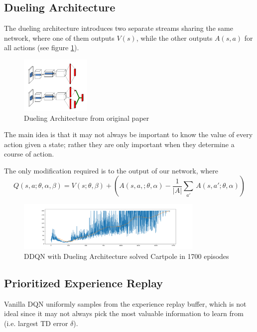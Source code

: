 \documentclass[11pt]{article} %
\begin{document}
\subsection{Dueling Architecture}
The dueling architecture introduces two separate streams sharing the same network, where one of them outputs $V(s)$, while the other outputs $A(s,a)$ for all actions (see figure \ref{fig:duelingarch}).

\begin{figure}
  \begin{center}
    \includegraphics[width=0.3\textwidth]{images/duelingarch.png}
  \end{center}
  \caption{Dueling Architecture from original paper}
  \label{fig:duelingarch}
\end{figure}

The main idea is that it may not always be important to know the value of every action given a state; rather they are only important when they determine a course of action.

The only modification required is to the output of our network, where 
\begin{equation*}
    Q(s,a;\theta,\alpha,\beta) = V(s; \theta, \beta) + (A(s,a,;\theta,\alpha) - \frac{1}{|A|}\sum_{a'}\, A(s,a';\theta,\alpha))
\end{equation*}

\begin{figure}
    \centering
    \includegraphics[width=0.8\textwidth]{DQN/Dueling-Double_w_ER_FixedQ/cartpole/1700eps_cartpole.png}
    \caption{DDQN with Dueling Architecture solved Cartpole in 1700 episodes}
    \label{fig:my_label}
\end{figure}

\subsection{Prioritized Experience Replay}
Vanilla DQN uniformly samples from the experience replay buffer, which is not ideal since it may not always pick the most valuable information to learn from (i.e. largest TD error $\delta$).
\end{document}
